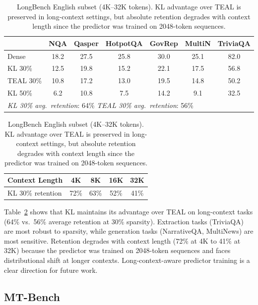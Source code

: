 \documentclass[11pt,a4paper]{article}
\begin{document}
\begin{table}[t]
\centering
\caption{LongBench English subset (4K--32K tokens). KL advantage over TEAL is preserved in long-context settings, but absolute retention degrades with context length since the predictor was trained on 2048-token sequences.}
\label{tab:longbench}
\small
\begin{tabular}{lcccccc}
\toprule
 & \textbf{NQA} & \textbf{Qasper} & \textbf{HotpotQA} & \textbf{GovRep} & \textbf{MultiN} & \textbf{TriviaQA} \\
\midrule
Dense & 18.2 & 27.5 & 25.8 & 30.0 & 25.1 & 82.0 \\
KL 30\% & 12.5 & 19.8 & 15.2 & 22.1 & 17.5 & 56.8 \\
TEAL 30\% & 10.8 & 17.2 & 13.0 & 19.5 & 14.8 & 50.2 \\
KL 50\% & 6.2 & 10.8 & 7.5 & 14.2 & 9.1 & 32.5 \\
\midrule
\multicolumn{7}{l}{\emph{KL 30\% avg.\ retention}: 64\% \quad \emph{TEAL 30\% avg.\ retention}: 56\%} \\
\bottomrule
\end{tabular}

\vspace{0.5em}
\begin{tabular}{lcccc}
\toprule
\textbf{Context Length} & \textbf{4K} & \textbf{8K} & \textbf{16K} & \textbf{32K} \\
\midrule
KL 30\% retention & 72\% & 63\% & 52\% & 41\% \\
\bottomrule
\end{tabular}
\end{table}

Table~\ref{tab:longbench} shows that KL maintains its advantage over TEAL on long-context tasks (64\% vs.\ 56\% average retention at 30\% sparsity). Extraction tasks (TriviaQA) are most robust to sparsity, while generation tasks (NarrativeQA, MultiNews) are most sensitive. Retention degrades with context length (72\% at 4K to 41\% at 32K) because the predictor was trained on 2048-token sequences and faces distributional shift at longer contexts. Long-context-aware predictor training is a clear direction for future work.

\subsection{MT-Bench}
\end{document}
